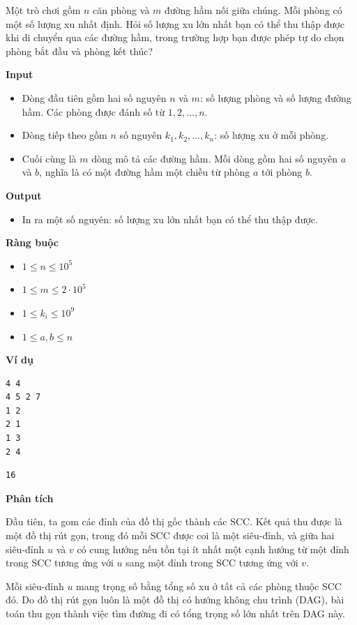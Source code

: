 \documentclass{article}
\begin{document}
Một trò chơi gồm $n$ căn phòng và $m$ đường hầm nối giữa chúng. Mỗi phòng có một số lượng xu nhất định. Hỏi số lượng xu lớn nhất bạn có thể thu thập được khi di chuyển qua các đường hầm, trong trường hợp bạn được phép tự do chọn phòng bắt đầu và phòng kết thúc?

\textbf{Input}
\begin{itemize}
    \item Dòng đầu tiên gồm hai số nguyên $n$ và $m$: số lượng phòng và số lượng đường hầm. Các phòng được đánh số từ $1, 2, \ldots, n$.
    \item Dòng tiếp theo gồm $n$ số nguyên $k_1, k_2, \ldots, k_n$: số lượng xu ở mỗi phòng.
    \item Cuối cùng là $m$ dòng mô tả các đường hầm. Mỗi dòng gồm hai số nguyên $a$ và $b$, nghĩa là có một đường hầm một chiều từ phòng $a$ tới phòng $b$.
\end{itemize}

\textbf{Output}
\begin{itemize}
    \item In ra một số nguyên: số lượng xu lớn nhất bạn có thể thu thập được.
\end{itemize}

\textbf{Ràng buộc}
\begin{itemize}
    \item $1 \leq n \leq 10^5$
    \item $1 \leq m \leq 2 \cdot 10^5$
    \item $1 \leq k_i \leq 10^9$
    \item $1 \leq a, b \leq n$
\end{itemize}

\textbf{Ví dụ}

\begin{lstlisting}[caption={Input}]
4 4
4 5 2 7
1 2
2 1
1 3
2 4
\end{lstlisting}

\begin{lstlisting}[caption={Output}]
16
\end{lstlisting}

\textbf{Phân tích}

Đầu tiên, ta gom các đỉnh của đồ thị gốc thành các SCC. Kết quả thu được là một đồ thị rút gọn, trong đó mỗi SCC được coi là một siêu-đỉnh, và giữa hai siêu-đỉnh $u$ và $v$ có cung hướng nếu tồn tại ít nhất một cạnh hướng từ một đỉnh trong SCC tương ứng với $u$ sang một đỉnh trong SCC tương ứng với $v$.  

Mỗi siêu-đỉnh $u$ mang trọng số bằng tổng số xu ở tất cả các phòng thuộc SCC đó. Do đồ thị rút gọn luôn là một đồ thị có hướng không chu trình (DAG), bài toán thu gọn thành việc tìm đường đi có tổng trọng số lớn nhất trên DAG này.
\end{document}
